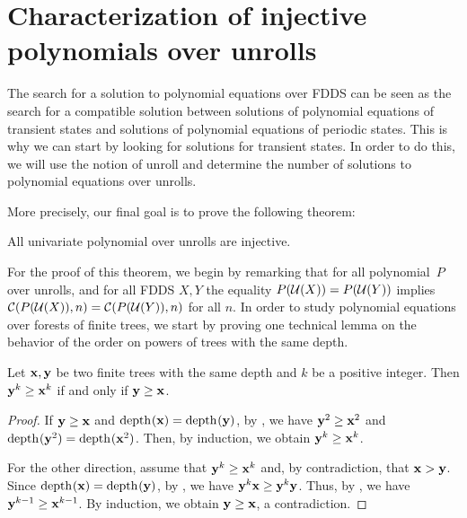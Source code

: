 \section{Characterization of injective polynomials over unrolls}\label{section:poly_unroll}
	
	The search for a solution to polynomial equations over FDDS can be seen as the search for a compatible solution between solutions of polynomial equations of transient states and solutions of polynomial equations of periodic states.
	This is why we can start by looking for solutions for transient states.
	In order to do this, we will use the notion of unroll and determine the number of solutions to polynomial equations over unrolls.
	
	More precisely, our final goal is to prove the following theorem:
	\begin{theorem}\label{th:injPolyUnrolls}
		All univariate polynomial over unrolls are injective. 
	\end{theorem}
	
	For the proof of this theorem, we begin by remarking that for all polynomial~$P$ over unrolls, and for all FDDS $X,Y$ the equality $P(\mathcal{U}(X)) = P(\mathcal{U}(Y))$ implies $\mathcal{C}(P(\mathcal{U}(X)),n) = \mathcal{C}(P(\mathcal{U}(Y)),n)$ for all $n$. In order to study polynomial equations over forests of finite trees, we start by proving one technical lemma on the behavior of the order on powers of trees with the same depth.
	
		
		\begin{lemma}\label{lemma:behaviorOrderWithProduct}
			Let $\tree{x}, \tree{y}$ be two finite trees with the same depth and $k$ be a  positive integer. Then $\tree{y}^k \ge \tree{x}^k$ if and only if $\tree{y} \ge \tree{x}$.
		\end{lemma}
	
		\begin{proof}
			If $\tree{y} \ge \tree{x}$ and $\depth{\tree{x}} = \depth{\tree{y}}$, by \cite[Corollary 20]{article_arbre}, we have $\tree{y}^2 \ge \tree{x}^2$ and $\depth{\tree{y}^2} = \depth{\tree{x}^2}$. 
			Then, by induction, we obtain $\tree{y}^k \ge \tree{x}^k$.
			
			For the other direction, assume that $\tree{y}^k \ge \tree{x}^k$ and, by contradiction, that $\tree{x} > \tree{y}$. 
			Since $\depth{\tree{x}} = \depth{\tree{y}}$, by \cite[Corollary 20]{article_arbre}, we have $\tree{y}^k \tree{x} \ge \tree{y}^k \tree{y}$. 
			Thus, by \cite[Lemma 21]{article_arbre}, we have $\tree{y}^{k-1} \ge \tree{x}^{k-1}$. 
			By induction, we obtain $\tree{y} \ge \tree{x}$, a contradiction.
	\end{proof}
		
